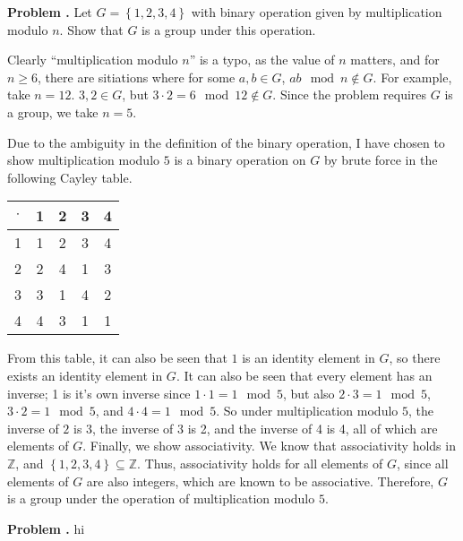 \documentclass[11pt, letterpaper]{report}
\newcounter{prob}\setcounter{prob}{0}
\renewcommand{\theprob}{\textbf{Problem \arabic{prob}. }}
\newcommand{\problem}{\stepcounter{prob}\noindent\theprob}
\begin{document}
\problem Let $G=\left\{ 1,2,3,4 \right\} $ with binary operation given by multiplication modulo $n$. Show that $G$ is a group under this operation.
\begin{solution}
	Clearly ``multiplication modulo $n$'' is a typo, as the value of $n$ matters, and for $n\geq 6$, there are sitiations where for some $a,b\in G$, $ab\mod n\notin G$. For example, take $n=12$. $3,2\in G$, but $3\cdot 2=6\mod 12\notin G$. Since the problem requires $G$ is a group, we take $n=5$.

	Due to the ambiguity in the definition of the binary operation, I have chosen to show multiplication modulo $5$ is a binary operation on $G$ by brute force in the following Cayley table.
	\begin{center}
		\begin{tabular}{c|cccc}
			$\cdot $ &1&2&3&4\\
			\hline
			1&1&2&3&4\\
			2&2&4&1&3\\
			3&3&1&4&2\\
			4&4&3&1&1
		\end{tabular}
	\end{center}
	From this table, it can also be seen that $1$ is an identity element in $G$, so there exists an identity element in $G$. It can also be seen that every element has an inverse; 1 is it's own inverse since $1\cdot 1=1\mod 5$, but also $2\cdot 3=1\mod 5$, $3\cdot2 =1\mod 5$, and $4\cdot 4=1\mod 5$. So under multiplication modulo $5$, the inverse of $2$ is $3$, the inverse of $3$ is 2, and the inverse of 4 is 4, all of which are elements of $G$. Finally, we show associativity. We know that associativity holds in $\mathbb{Z}$, and $\left\{ 1,2,3,4 \right\} \subseteq \mathbb{Z}$. Thus, associativity holds for all elements of $G$, since all elements of $G$ are also integers, which are known to be associative. Therefore, $G$ is a group under the operation of multiplication modulo $5$.
\end{solution}

\problem hi
\end{document}

